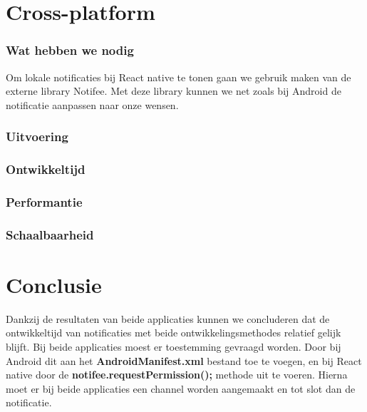 


\section{Cross-platform}
\subsubsection{Wat hebben we nodig}
Om lokale notificaties bij React native te tonen gaan we gebruik maken van de externe library Notifee.
Met deze library kunnen we net zoals bij Android de notificatie aanpassen naar onze wensen.

\subsubsection{Uitvoering}



\subsubsection{Ontwikkeltijd}



\subsubsection{Performantie}



\subsubsection{Schaalbaarheid}



\section{Conclusie}
Dankzij de resultaten van beide applicaties kunnen we concluderen dat de ontwikkeltijd van notificaties met 
beide ontwikkelingsmethodes relatief gelijk blijft. Bij beide applicaties moest er toestemming gevraagd worden. 
Door bij Android dit aan het \textbf{AndroidManifest.xml} bestand toe te voegen, en bij React native door 
de \textbf{notifee.requestPermission();} methode uit te voeren. Hierna moet er bij beide applicaties een 
channel worden aangemaakt en tot slot dan de notificatie.

